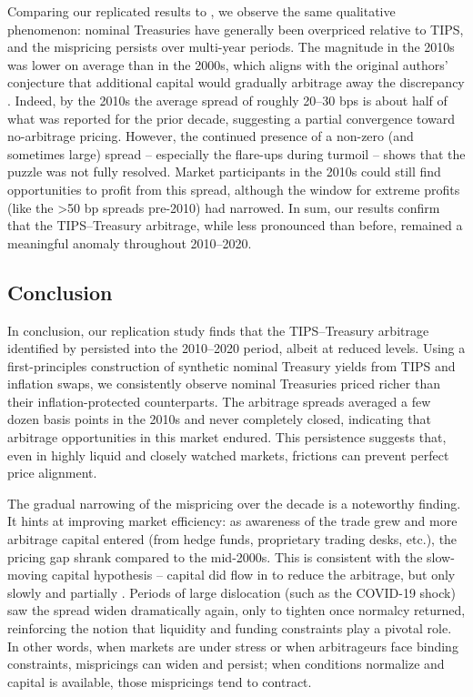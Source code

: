 \documentclass[12pt]{article}
\begin{document}
Comparing our replicated results to \cite{Fleckenstein}, we observe the same qualitative phenomenon: nominal Treasuries have 
generally been overpriced relative to TIPS, and the mispricing persists over multi-year periods. The magnitude in the 2010s was lower on average 
than in the 2000s, which aligns with the original authors’ conjecture that additional capital would gradually arbitrage away the discrepancy 
\citep{Fleckenstein}. Indeed, by the 2010s the average spread of roughly 20–30 bps is about half of what was reported for the prior decade, 
suggesting a partial convergence toward no-arbitrage pricing. However, the continued presence of a non-zero (and sometimes large) spread – 
especially the flare-ups during turmoil – shows that the puzzle was not fully resolved. Market participants in the 2010s could still find 
opportunities to profit from this spread, although the window for extreme profits (like the >50 bp spreads pre-2010) had narrowed. In sum, 
our results confirm that the TIPS–Treasury arbitrage, while less pronounced than before, remained a meaningful anomaly throughout 2010–2020.


\subsection{Conclusion}  
In conclusion, our replication study finds that the TIPS–Treasury arbitrage identified by \cite{Fleckenstein} persisted into the 2010–2020 period, 
albeit at reduced levels. Using a first-principles construction of synthetic nominal Treasury yields from TIPS and inflation swaps, we consistently 
observe nominal Treasuries priced richer than their inflation-protected counterparts. The arbitrage spreads averaged a few dozen basis points in the 
2010s and never completely closed, indicating that arbitrage opportunities in this market endured. This persistence suggests that, even in highly 
liquid and closely watched markets, frictions can prevent perfect price alignment.

The gradual narrowing of the mispricing over the decade is a noteworthy finding. It hints at improving market efficiency: as awareness of the 
trade grew and more arbitrage capital entered (from hedge funds, proprietary trading desks, etc.), the pricing gap shrank compared to the mid-2000s. 
This is consistent with the slow-moving capital hypothesis – capital did flow in to reduce the arbitrage, but only slowly and partially 
\citep{Fleckenstein}. Periods of large dislocation (such as the COVID-19 shock) saw the spread widen dramatically again, only to tighten once 
normalcy returned, reinforcing the notion that liquidity and funding constraints play a pivotal role. In other words, when markets are under 
stress or when arbitrageurs face binding constraints, mispricings can widen and persist; when conditions normalize and capital is available, 
those mispricings tend to contract.
\end{document}
